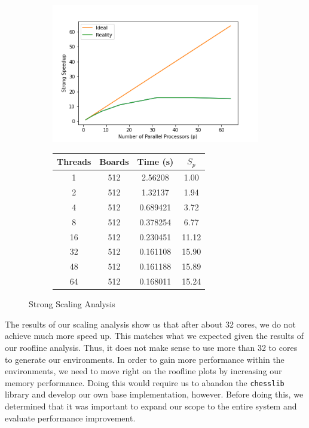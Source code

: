 \documentclass[12pt]{article}
\begin{document}
\begin{figure}[H]
    \centering
    \begin{subfigure}[c]{0.55\textwidth}
        \centering
        \includegraphics[width=\textwidth]{plots/strong_scaling.png}
    \end{subfigure}
    \hfill
    \begin{subfigure}[c]{0.44\textwidth}
        \centering
        \begin{tabular}{||cccc||} 
            \hline
            Threads & Boards & Time (s) & $S_p$\\ %
            \hline\hline
            1 & 512 & 2.56208 & 1.00\\
            \hline
            2 & 512 & 1.32137 & 1.94\\
            \hline
            4 & 512 & 0.689421 &  3.72\\
            \hline
            8 & 512 & 0.378254 &  6.77\\
            \hline
            16 & 512 & 0.230451 & 11.12\\
            \hline
            32 & 512 & 0.161108 & 15.90\\
            \hline
            48 & 512 & 0.161188 & 15.89\\
            \hline
            64 & 512 & 0.168011 & 15.24\\ %
            \hline
        \end{tabular}
    \end{subfigure}
    \caption{Strong Scaling Analysis}
\end{figure}

The results of our scaling analysis show us that after about 32 cores, we do not achieve much more speed up. This matches what we expected given the results of our roofline analysis. Thus, it does not make sense to use more than 32 to cores to generate our environments. In order to gain more performance within the environments, we need to move right on the roofline plots by increasing our memory performance. Doing this would require us to abandon the \texttt{chesslib} library and develop our own base implementation, however. Before doing this, we determined that it was important to expand our scope to the entire system and evaluate performance improvement.
\end{document}
